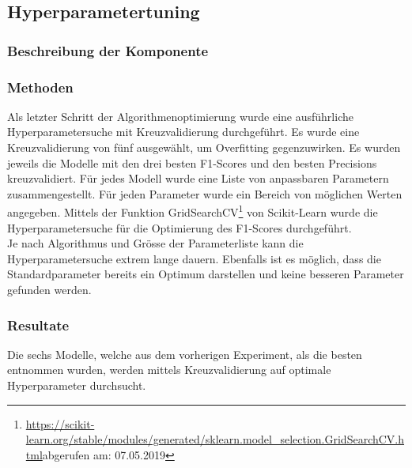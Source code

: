 \subsection{Hyperparametertuning}
\subsubsection{Beschreibung der Komponente}
\subsubsection{Methoden}
Als letzter Schritt der Algorithmenoptimierung wurde eine ausführliche Hyperparametersuche mit Kreuzvalidierung durchgeführt.
Es wurde eine Kreuzvalidierung von fünf ausgewählt, um Overfitting gegenzuwirken.
Es wurden jeweils die Modelle mit den drei besten F1-Scores und den besten Precisions kreuzvalidiert.
Für jedes Modell wurde eine Liste von anpassbaren Parametern zusammengestellt.
Für jeden Parameter wurde ein Bereich von möglichen Werten angegeben.
Mittels der Funktion \glqq GridSearchCV\grqq{}\footnote{\url{https://scikit-learn.org/stable/modules/generated/sklearn.model_selection.GridSearchCV.html}abgerufen am: 07.05.2019} von Scikit-Learn wurde die Hyperparametersuche für die Optimierung des F1-Scores durchgeführt.\\
Je nach Algorithmus und Grösse der Parameterliste kann die Hyperparametersuche extrem lange dauern.
Ebenfalls ist es möglich, dass die Standardparameter bereits ein Optimum darstellen und keine besseren Parameter gefunden werden.
\subsubsection{Resultate}
Die sechs Modelle, welche aus dem vorherigen Experiment, als die besten entnommen wurden, werden mittels Kreuzvalidierung auf optimale Hyperparameter durchsucht.
